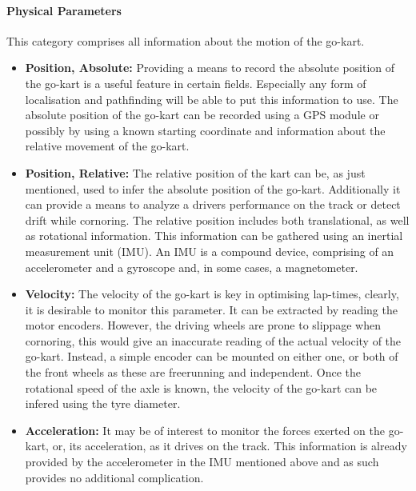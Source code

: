 \paragraph*{Physical Parameters}
This category comprises all information about the motion of the go-kart.
\begin{itemize}
	\item \textbf{Position, Absolute:} Providing a means to record the absolute position of the go-kart is a useful feature in certain fields.
	Especially any form of localisation and pathfinding will be able to put this information to use.
	The absolute position of the go-kart can be recorded using a GPS module or possibly by using a known starting coordinate and information about the relative movement of the go-kart.
	\item \textbf{Position, Relative:} The relative position of the kart can be, as just mentioned, used to infer the absolute position of the go-kart.
	Additionally it can provide a means to analyze a drivers performance on the track or detect drift while cornoring.
	The relative position includes both translational, as well as rotational information.
	This information can be gathered using an inertial measurement unit (IMU).
	An IMU is a compound device, comprising of an accelerometer and a gyroscope and, in some cases, a magnetometer.
	\item \textbf{Velocity:} The velocity of the go-kart is key in optimising lap-times, clearly, it is desirable to monitor this parameter.
	It can be extracted by reading the motor encoders.
	However, the driving wheels are prone to slippage when cornoring, this would give an inaccurate reading of the actual velocity of the go-kart.
	Instead, a simple encoder can be mounted on either one, or both of the front wheels as these are freerunning and independent.
	Once the rotational speed of the axle is known, the velocity of the go-kart can be infered using the tyre diameter.
	\item \textbf{Acceleration:} It may be of interest to monitor the forces exerted on the go-kart, or, its acceleration, as it drives on the track.
	This information is already provided by the accelerometer in the IMU mentioned above and as such provides no additional complication.
\end{itemize}
